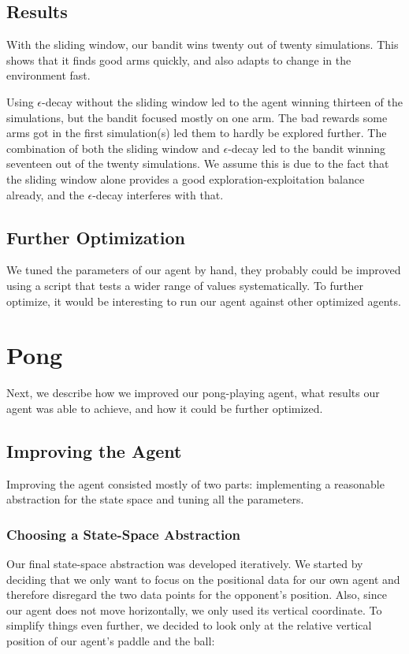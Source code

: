 \documentclass[10pt]{article}
\begin{document}
\subsection{Results}\label{subsec:mab-results}
With the sliding window, our bandit wins twenty out of twenty simulations.
This shows that it finds good arms quickly, and also adapts to change in the environment fast.

Using $\epsilon$-decay without the sliding window led to the agent winning thirteen of the simulations, but the bandit focused mostly on one arm.
The bad rewards some arms got in the first simulation(s) led them to hardly be explored further.
The combination of both the sliding window and $\epsilon$-decay led to the bandit winning seventeen out of the twenty simulations.
We assume this is due to the fact that the sliding window alone provides a good exploration-exploitation balance already, and the $\epsilon$-decay interferes with that.


\subsection{Further Optimization}\label{subsec:mab-further-optimization}
We tuned the parameters of our agent by hand, they probably could be improved using a script that tests a wider range of values systematically.
To further optimize, it would be interesting to run our agent against other optimized agents.


\section{Pong}\label{sec:pong}
Next, we describe how we improved our pong-playing agent, what results our agent was able to achieve, and how it could be further optimized.

\subsection{Improving the Agent}\label{subsec:improving-the-agent}
Improving the agent consisted mostly of two parts: implementing a reasonable abstraction for the state space and tuning all the parameters.

\subsubsection{Choosing a State-Space Abstraction}
Our final state-space abstraction was developed iteratively.
We started by deciding that we only want to focus on the positional data for our own agent and therefore disregard the two data points for the opponent's position.
Also, since our agent does not move horizontally, we only used its vertical coordinate.
To simplify things even further, we decided to look only at the relative vertical position of our agent's paddle and the ball:
\end{document}
